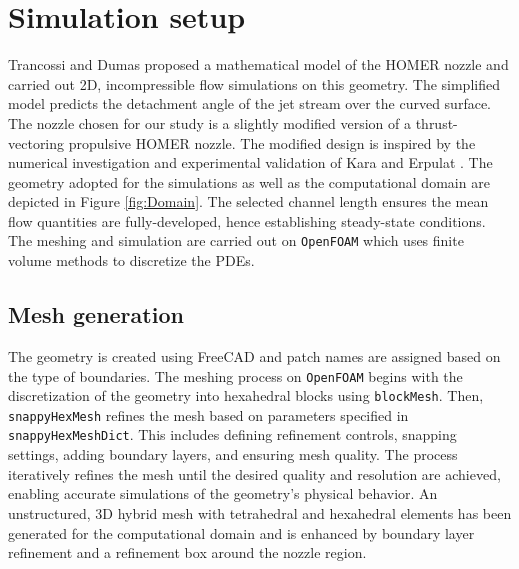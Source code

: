 \section{Simulation setup} \label{setup}
Trancossi and Dumas \cite{trandum} proposed a mathematical model of the HOMER nozzle and carried out 2D, incompressible flow simulations on this geometry. The simplified model predicts the detachment angle of the jet stream over the curved surface. The nozzle chosen for our study is a slightly modified version of a thrust-vectoring propulsive HOMER nozzle. The modified design is inspired by the numerical investigation and experimental validation of Kara and Erpulat \cite{kara}. The geometry adopted for the simulations as well as the computational domain are depicted in Figure \ref{fig:Domain}. The selected channel length ensures the mean flow quantities are fully-developed, hence establishing steady-state conditions. The meshing and simulation are carried out on \verb|OpenFOAM| which uses finite volume methods to discretize the PDEs. 
\subsection{Mesh generation}
The geometry is created using FreeCAD \cite{FreeCAD} and patch names are assigned based on the type of boundaries.  The meshing process on \verb|OpenFOAM| begins with the discretization of the geometry into hexahedral blocks using \verb|blockMesh|. Then, \verb|snappyHexMesh| refines the mesh based on parameters specified in \verb|snappyHexMeshDict|. This includes defining refinement controls, snapping settings, adding boundary layers, and ensuring mesh quality. The process iteratively refines the mesh until the desired quality and resolution are achieved, enabling accurate simulations of the geometry's physical behavior. An unstructured, 3D hybrid mesh with tetrahedral and hexahedral elements has been generated for the computational domain and is enhanced by boundary layer refinement and a refinement box around the nozzle region.

